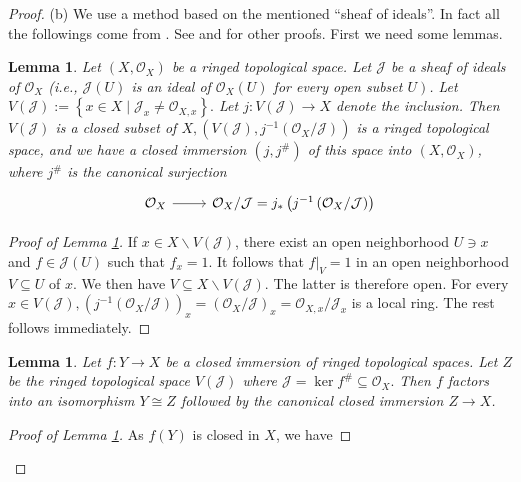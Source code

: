 \documentclass{amsart}
\newtheorem{lm}[theorem]{Lemma}
\begin{document}
\begin{proof}
	(b) We use a method based on the mentioned ``sheaf of ideals''. In fact all the followings come from \cite[Ch. 2, Prop. 3.20, P. 47]{LIU}. See \cite[Ch. 3, Th. 3.42, P. 84]{GW} and \cite[P. 32]{BAG} for other proofs. First we need some lemmas.
	\begin{lm}
		\label{l13}
		Let $\left(X, \mathcal{O}_{X}\right)$ be a ringed topological space. Let $\mathcal{J}$ be a sheaf of ideals of $\mathcal{O}_{X}$ (i.e., $\mathcal{J}(U)$ is an ideal of $\mathcal{O}_{X}(U)$ for every open subset $\left.U\right)$. Let $V(\mathcal{J}):=\left\{x \in X \mid \mathcal{J}_{x} \neq \mathcal{O}_{X, x}\right\} .$ Let $j: V(\mathcal{J}) \rightarrow X$ denote the inclusion. Then $V(\mathcal{J})$ is a closed subset of $X,\left(V(\mathcal{J}), j^{-1}\left(\mathcal{O}_{X} / \mathcal{J}\right)\right)$ is a ringed topological space, and we have a closed immersion $\left(j, j^{\#}\right)$ of this space into $\left(X, \mathcal{O}_{X}\right)$, where $j^{\#}$ is the canonical surjection
		\begin{equation*}
			\begin{tikzcd}
				\mathcal{O}_{X} \arrow[r] & \mathcal{O}_{X} / \mathcal{J}=j_{*}\left(j^{-1}\left(\mathcal{O}_{X} / \mathcal{J}\right)\right)
			\end{tikzcd}
		\end{equation*}
	\end{lm}
	\begin{proof}[Proof of Lemma \ref*{l13}]
		If $x \in X \backslash V(\mathcal{J})$, there exist an open neighborhood $U \ni x$ and $f \in \mathcal{J}(U)$ such that $f_{x}=1$. It follows that $\left.f\right|_{V}=1$ in an open neighborhood $V \subseteq U$ of $x$. We then have $V \subseteq X \backslash V(\mathcal{J})$. The latter is therefore open. For every $x \in V(\mathcal{J}),\left(j^{-1}\left(\mathcal{O}_{X} / \mathcal{J}\right)\right)_{x}=\left(\mathcal{O}_{X} / \mathcal{J}\right)_{x}=\mathcal{O}_{X, x} / \mathcal{J}_{x}$ is a local ring.
		The rest follows immediately.
	\end{proof}
	\begin{lm}
		\label{l14}
		Let $f: Y \rightarrow X$ be a closed immersion of ringed topological spaces. Let $Z$ be the ringed topological space $V(\mathcal{J})$ where $\mathcal{J}=\ker f^{\#} \subseteq \mathcal{O}_{X} .$ Then $f$ factors into an isomorphism $Y \cong Z$ followed by the canonical closed immersion $Z \rightarrow X$.
	\end{lm}
	\begin{proof}[Proof of Lemma \ref*{l14}]
		As $f(Y)$ is closed in $X$, we have

\end{proof}
\end{proof}
\end{document}
